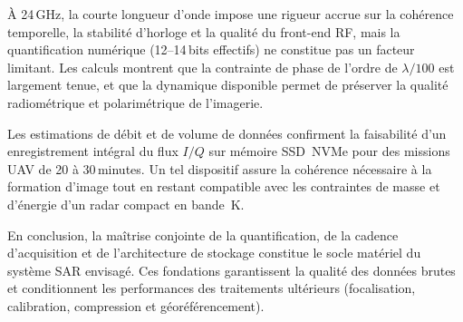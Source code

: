 À 24\,GHz, la courte longueur d’onde impose une rigueur accrue sur la cohérence temporelle, la stabilité d’horloge et la qualité du front-end RF, mais la quantification numérique (12–14\,bits effectifs) ne constitue pas un facteur limitant. Les calculs montrent que la contrainte de phase de l’ordre de $\lambda/100$ est largement tenue, et que la dynamique disponible permet de préserver la qualité radiométrique et polarimétrique de l’imagerie.

Les estimations de débit et de volume de données confirment la faisabilité d’un enregistrement intégral du flux $I/Q$ sur mémoire SSD~NVMe pour des missions UAV de 20 à 30\,minutes. Un tel dispositif assure la cohérence nécessaire à la formation d’image tout en restant compatible avec les contraintes de masse et d’énergie d’un radar compact en bande~K.

En conclusion, la maîtrise conjointe de la quantification, de la cadence d’acquisition et de l’architecture de stockage constitue le socle matériel du système SAR envisagé. Ces fondations garantissent la qualité des données brutes et conditionnent les performances des traitements ultérieurs (focalisation, calibration, compression et géoréférencement).